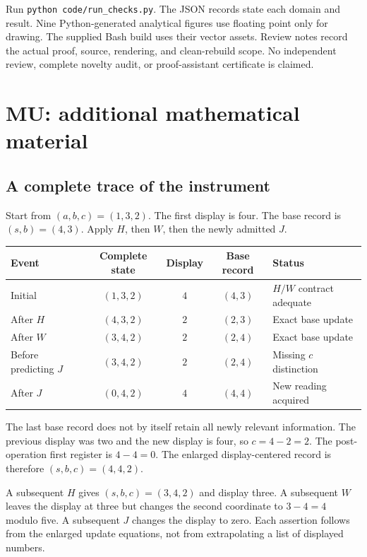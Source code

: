 \documentclass[11pt,oneside,openany]{book}
\numberwithin{equation}{section}
\begin{document}
Run \texttt{python code/run\_checks.py}. The JSON records state each domain and result. Nine Python-generated analytical figures use floating point only for drawing. The supplied Bash build uses their vector assets. Review notes record the actual proof, source, rendering, and clean-rebuild scope. No independent review, complete novelty audit, or proof-assistant certificate is claimed.



\chapter{MU: additional mathematical material}
\setcounter{section}{0}

\section{A complete trace of the instrument}\label{MU:app:trace}
Start from $(a,b,c)=(1,3,2)$. The first display is four. The base record is $(s,b)=(4,3)$. Apply $H$, then $W$, then the newly admitted $J$.

\begin{center}
\begin{tabular}{@{}lcccl@{}}\toprule
Event & Complete state & Display & Base record & Status\\\midrule
Initial & $(1,3,2)$ & $4$ & $(4,3)$ & $H/W$ contract adequate\\
After $H$ & $(4,3,2)$ & $2$ & $(2,3)$ & Exact base update\\
After $W$ & $(3,4,2)$ & $2$ & $(2,4)$ & Exact base update\\
Before predicting $J$ & $(3,4,2)$ & $2$ & $(2,4)$ & Missing $c$ distinction\\
After $J$ & $(0,4,2)$ & $4$ & $(4,4)$ & New reading acquired\\\bottomrule
\end{tabular}
\end{center}

The last base record does not by itself retain all newly relevant information. The previous display was two and the new display is four, so $c=4-2=2$. The post-operation first register is $4-4=0$. The enlarged display-centered record is therefore $(s,b,c)=(4,4,2)$.

A subsequent $H$ gives $(s,b,c)=(3,4,2)$ and display three. A subsequent $W$ leaves the display at three but changes the second coordinate to $3-4=4$ modulo five. A subsequent $J$ changes the display to zero. Each assertion follows from the enlarged update equations, not from extrapolating a list of displayed numbers.
\end{document}
